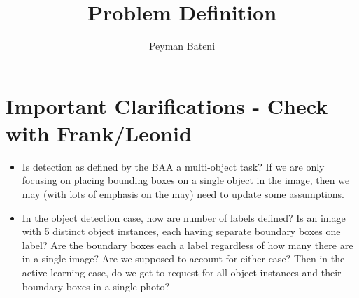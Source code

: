 \documentclass{article}
\title{Problem Definition}
\author{Peyman Bateni}
\begin{document}
\maketitle

\section{Important Clarifications - Check with Frank/Leonid}
\begin{itemize}
    \item Is detection as defined by the BAA a multi-object task? If we are only focusing on placing bounding boxes on a single object in the image, then we may (with lots of emphasis on the may) need to update some assumptions.
    \item In the object detection case, how are number of labels defined? Is an image with 5 distinct object instances, each having separate boundary boxes one label? Are the boundary boxes each a label regardless of how many there are in a single image? Are we supposed to account for either case? Then in the active learning case, do we get to request for all object instances and their boundary boxes in a single photo?
\end{itemize}
\end{document}
